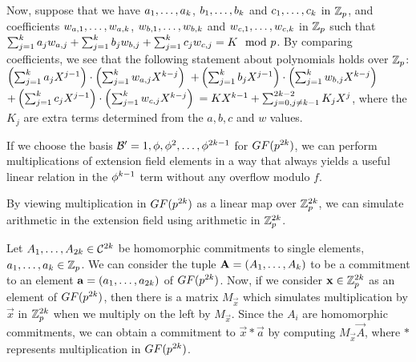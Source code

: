 Now, suppose that we have $a_1,\ldots,a_k$, $b_1,\ldots,b_k$ and $c_1,\ldots,c_k$ in $\mathbb{Z}_p$, and coefficients $w_{a,1},\ldots,w_{a,k}$, $w_{b,1},\ldots,w_{b,k}$ and $w_{c,1},\ldots,w_{c,k}$ in $\mathbb{Z}_p$ such that $\sum_{j=1}^k a_j w_{a,j} + \sum_{j=1}^k b_j w_{b,j} + \sum_{j=1}^k c_j w_{c,j} = K\mod {p}$. By comparing coefficients, we see that the following statement about polynomials holds over $\mathbb{Z}_p$:
$\left( \sum_{j=1}^k a_j X^{j-1} \right) \cdot \left( \sum_{j=1}^k w_{a,j} X^{k-j} \right) $ $
+ \left( \sum_{j=1}^k b_j X^{j-1} \right) \cdot \left( \sum_{j=1}^k w_{b,j} X^{k-j} \right) $ $
+ \left( \sum_{j=1}^k c_j X^{j-1} \right) \cdot \left( \sum_{j=1}^k w_{c,j} X^{k-j} \right) $ $
= K X^{k-1} + \sum_{j=0,j\neq k-1}^{2k-2} K_jX^j
$, where the $K_j$ are extra terms determined from the $a,b,c$ and $w$ values.

If we choose the basis $\mathcal{B}' = 1,\phi,\phi^2,\ldots,\phi^{2k-1}$ for $GF(p^{2k})$, we can perform multiplications of extension field elements in a way that always yields a useful linear relation in the $\phi^{k-1}$ term without any overflow modulo $f$.

By viewing multiplication in $GF(p^{2k})$ as a linear map over $\mathbb{Z}_p^{2k}$, we can simulate arithmetic in the extension field using arithmetic in $\mathbb{Z}_p^{2k}$.

Let $A_1,\ldots,A_{2k} \in \mathcal{C}^{2k}$ be homomorphic commitments to single elements, $a_1,\ldots,a_k \in \mathbb{Z}_p$. We can consider the tuple $\mathbf{A} = (A_1,\ldots,A_k)$ to be a commitment to an element $\mathbf{a} = (a_1,\ldots,a_{2k})$ of $GF(p^{2k})$. Now, if we consider $\mathbf{x} \in \mathbb{Z}_p^{2k}$ as an element of $GF(p^{2k})$, then there is a matrix $M_{\vec{x}}$ which simulates multiplication by $\vec{x}$ in $\mathbb{Z}_p^{2k}$ when we multiply on the left by $M_{\vec{x}}$. Since the $A_i$ are homomorphic commitments, we can obtain a commitment to $\vec{x} * \vec{a}$ by computing $M_{\vec{x}} \vec{A}$, where $*$ represents multiplication in $GF(p^{2k})$.

